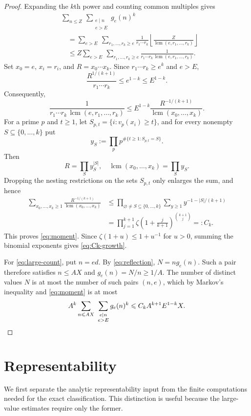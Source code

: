 \documentclass[11pt,letterpaper,reqno]{amsart}
\numberwithin{equation}{section}
\theoremstyle{remark}
\newcommand{\1}{\mathbf 1}
\DeclareMathOperator{\lcm}{lcm}
\renewcommand{\leq}{\leqslant}
\renewcommand{\geq}{\geqslant}
\begin{document}
\begin{proof}
Expanding the $k$th power and counting common multiples gives
\begin{align*}
 &\sum_{n\leq Z}\ \sum_{\substack{e\mid n\\e>E}}g_e(n)^k\\
 &\quad=\sum_{e>E}\ \sum_{r_1,\ldots,r_k\geq e}
 \frac1{r_1\cdots r_k}
 \left\lfloor\frac{Z}{\lcm(e,r_1,\ldots,r_k)}\right\rfloor\\
 &\quad\leq Z\sum_{e>E}\ \sum_{r_1,\ldots,r_k\geq e}
 \frac1{r_1\cdots r_k\,\lcm(e,r_1,\ldots,r_k)}.
\end{align*}
Set $x_0=e$, $x_i=r_i$, and $R=x_0\cdots x_k$. Since
$r_1\cdots r_k\geq e^k$ and $e>E$,
\[
 \frac{R^{1/(k+1)}}{r_1\cdots r_k}
 \leq e^{1-k}\leq E^{1-k}.
\]
Consequently,
\[
 \frac1{r_1\cdots r_k\,\lcm(e,r_1,\ldots,r_k)}
 \leq E^{1-k}\frac{R^{-1/(k+1)}}{\lcm(x_0,\ldots,x_k)}.
\]
For a prime $p$ and $t\geq1$, let
$S_{p,t}=\{i:v_p(x_i)\geq t\}$, and for every nonempty
$S\subseteq\{0,\ldots,k\}$ put
\[
 y_S:=\prod_p p^{\#\{t\geq1:S_{p,t}=S\}}.
\]
Then
\[
 R=\prod_S y_S^{|S|},\quad \lcm(x_0,\ldots,x_k)=\prod_S y_S.
\]
Dropping the nesting restrictions on the sets $S_{p,t}$ only enlarges the
sum, and hence
\begin{align*}
 \sum_{x_0,\ldots,x_k\geq1}
 \frac{R^{-1/(k+1)}}{\lcm(x_0,\ldots,x_k)}
 &\leq\prod_{\varnothing\ne S\subseteq\{0,\ldots,k\}}
 \sum_{y\geq1}y^{-1-|S|/(k+1)}\\
 &=\prod_{j=1}^{k+1}
 \zeta\!\left(1+\frac{j}{k+1}\right)^{\binom{k+1}{j}}
 =:C_k.
\end{align*}
This proves \eqref{eq:moment}. Since
$\zeta(1+u)\leq1+u^{-1}$ for $u>0$, summing the binomial exponents gives
\eqref{eq:Ck-growth}.

For \eqref{eq:large-count}, put $n=ed$. By \eqref{eq:reflection},
$N=ng_e(n)$. Such a pair therefore satisfies
$n\leq AX$ and $g_e(n)=N/n\geq1/A$. The number of distinct values $N$ is
at most the number of such pairs $(n,e)$, which by Markov's inequality and
\eqref{eq:moment} is at most
\[
 A^k\sum_{n\leq AX}\ \sum_{\substack{e\mid n\\e>E}}g_e(n)^k
 \leq C_kA^{k+1}E^{1-k}X.
\qedhere \]
\end{proof}


\section{Representability}

We first separate the analytic representability input from the finite
computations needed for the exact classification. This distinction is useful
because the large-value estimates require only the former.
\end{document}
